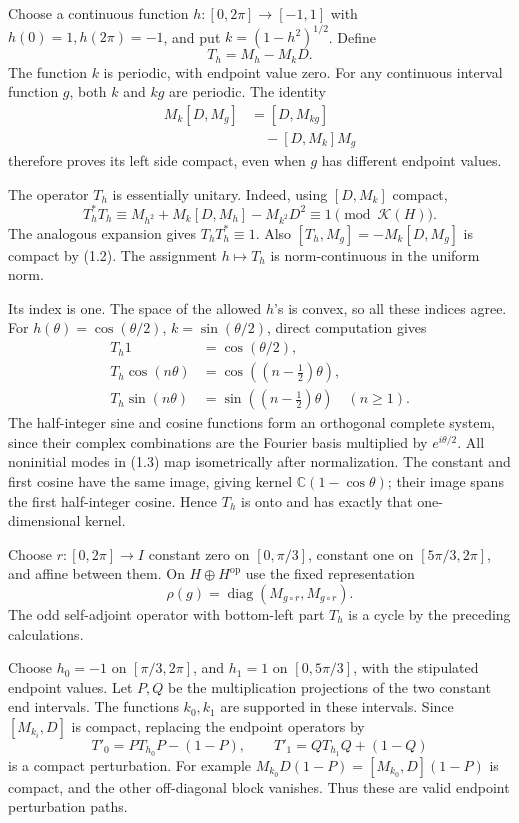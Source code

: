 \documentclass[
  11pt,
]{article}
\begin{document}
Choose a continuous function \(h:[0,2\pi]\to[-1,1]\) with
\(h(0)=1,h(2\pi)=-1\), and put \(k=(1-h^2)^{1/2}\). Define \[
T_h=M_h-M_kD.
\tag{1.1}
\] The function \(k\) is periodic, with endpoint value zero. For any
continuous interval function \(g\), both \(k\) and \(kg\) are periodic.
The identity \[
\begin{aligned}
M_k[D,M_g]&=[D,M_{kg}]\\
&\quad-[D,M_k]M_g
\end{aligned}
\tag{1.2}
\] therefore proves its left side compact, even when \(g\) has different
endpoint values.

The operator \(T_h\) is essentially unitary. Indeed, using \([D,M_k]\)
compact, \[
T_h^*T_h\equiv M_{h^2}+M_k[D,M_h]-M_{k^2}D^2\equiv1
\pmod{\mathcal K(H)}.
\] The analogous expansion gives \(T_hT_h^*\equiv1\). Also
\([T_h,M_g]=-M_k[D,M_g]\) is compact by (1.2). The assignment
\(h\mapsto T_h\) is norm-continuous in the uniform norm.

Its index is one. The space of the allowed \(h\)'s is convex, so all
these indices agree. For \(h(\theta)=\cos(\theta/2)\),
\(k=\sin(\theta/2)\), direct computation gives \[
\begin{aligned}
T_h1&=\cos(\theta/2),\\
T_h\cos(n\theta)&=\cos((n-\tfrac12)\theta),\\
T_h\sin(n\theta)&=\sin((n-\tfrac12)\theta)\quad(n\geq1).
\end{aligned}
\tag{1.3}
\] The half-integer sine and cosine functions form an orthogonal
complete system, since their complex combinations are the Fourier basis
multiplied by \(e^{i\theta/2}\). All noninitial modes in (1.3) map
isometrically after normalization. The constant and first cosine have
the same image, giving kernel \(\mathbb C(1-\cos\theta)\); their image
spans the first half-integer cosine. Hence \(T_h\) is onto and has
exactly that one-dimensional kernel.

Choose \(r:[0,2\pi]\to I\) constant zero on \([0,\pi/3]\), constant one
on \([5\pi/3,2\pi]\), and affine between them. On
\(H\oplus H^{\mathrm{op}}\) use the fixed representation \[
\rho(g)=\operatorname{diag}(M_{g\circ r},M_{g\circ r}).
\] The odd self-adjoint operator with bottom-left part \(T_h\) is a
cycle by the preceding calculations.

Choose \(h_0=-1\) on \([\pi/3,2\pi]\), and \(h_1=1\) on \([0,5\pi/3]\),
with the stipulated endpoint values. Let \(P,Q\) be the multiplication
projections of the two constant end intervals. The functions \(k_0,k_1\)
are supported in these intervals. Since \([M_{k_i},D]\) is compact,
replacing the endpoint operators by \[
T'_0=PT_{h_0}P-(1-P),\qquad
T'_1=QT_{h_1}Q+(1-Q)
\tag{1.4}
\] is a compact perturbation. For example
\(M_{k_0}D(1-P)=[M_{k_0},D](1-P)\) is compact, and the other
off-diagonal block vanishes. Thus these are valid endpoint perturbation
paths.
\end{document}
